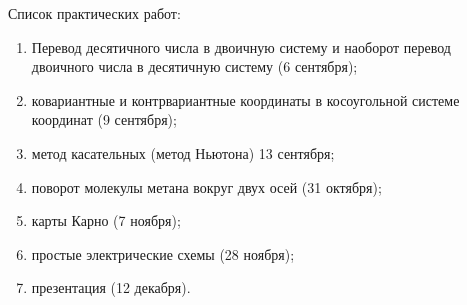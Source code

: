 \documentclass[a4paper,landscape,11pt]{article}
\begin{document}
\hspace{-2cm}
\begin{center} {\large Список практических работ:} \end{center}
\begin{enumerate}
\item Перевод десятичного числа в двоичную систему и наоборот перевод двоичного числа в десятичную систему (6 сентября);
\item ковариантные и контрвариантные координаты в косоугольной системе координат (9 сентября);
\item метод касательных (метод Ньютона) 13 сентября;
\item поворот молекулы метана вокруг двух осей (31 октября);
\item карты Карно (7 ноября);
\item простые электрические схемы (28 ноября);
\item презентация (12 декабря).
\end{enumerate}
\end{document}
